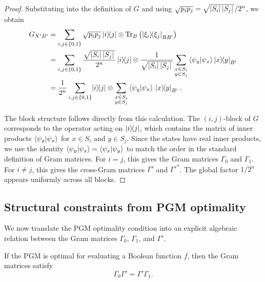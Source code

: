 \begin{proof}
Substituting into the definition of $G$ and using $\sqrt{p_i p_j} = \sqrt{\abs*{S_i}\abs*{S_j}}/2^n$, we obtain
\begin{equation}
\begin{aligned}
    G_{X'B'} &= \sum_{i,j \in \{ 0, 1 \}} \sqrt{p_i p_j} \ketbra{i}{j} \otimes \Tr_B\left(\ketbra{\xi_i}{\xi_j}_{BB'}\right) \\
    &= \sum_{i,j \in \{ 0, 1 \}} \frac{\sqrt{\abs*{S_i}\abs*{S_j}}}{2^n} \ketbra{i}{j} \otimes \frac{1}{\sqrt{\abs*{S_i}\abs*{S_j}}} \sum_{\substack{x \in S_i \\ y \in S_j}} \braket{\psi_y}{\psi_x} \!\ketbra*{x}{y}_{B'} \\
    &= \frac{1}{2^n} \sum_{i,j \in \{ 0, 1 \}} \!\ketbra{i}{j} \otimes \sum_{\substack{x \in S_i \\ y \in S_j}} \braket{\psi_y}{\psi_x} \ketbra*{x}{y}_{B'}.
\end{aligned}
\end{equation}

The block structure follows directly from this calculation.
The $(i,j)$-block of $G$ corresponds to the operator acting on $\ketbra{i}{j}$, which contains the matrix of inner products $\braket{\psi_y}{\psi_x}$ for $x \in S_i$ and $y \in S_j$.
Since the states have real inner products, we use the identity $\braket{\psi_y}{\psi_x} = \braket{\psi_x}{\psi_y}$ to match the order in the standard definition of Gram matrices.
For $i = j$, this gives the Gram matrices $\Gamma_0$ and $\Gamma_1$.
For $i \neq j$, this gives the cross-Gram matrices $\Gamma'$ and $\Gamma'^*$.
The global factor $1/2^n$ appears uniformly across all blocks.

\end{proof}


\subsection{Structural constraints from PGM optimality}

We now translate the PGM optimality condition into an explicit algebraic relation between the Gram matrices $\Gamma_0$, $\Gamma_1$, and $\Gamma'$.

\begin{theorem}\label{thm:ch5_qseq-gamma-comm}
    If the PGM is optimal for evaluating a Boolean function $f$, then the Gram matrices satisfy
    \begin{equation}\label{eq:ch5_qseq-gamma-comm}
        \Gamma_0 \Gamma' = \Gamma' \Gamma_1.
    \end{equation}
\end{theorem}

